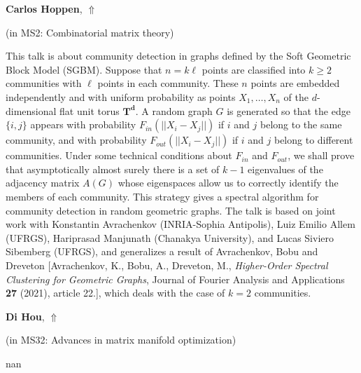 \documentclass[ILAS2025-program.tex]{subfiles}
\begin{document}
\hypertarget{down0296}{}\begin{ilasabstract}
    
\textbf{Carlos Hoppen},  \hfill \hyperlink{up0296}{$\Uparrow$}
    
    
(in {\color{mstitle}MS2: Combinatorial matrix theory})
        
\mtskip
    This talk is about community detection in graphs defined by the Soft Geometric Block Model (SGBM). Suppose that $n=k \ell$ points are classified into $k \geq 2$ communities with $\ell$ points in each community. These $n$ points are embedded independently and with uniform probability as points $X_1,\ldots,X_n$ of the $d$-dimensional flat unit torus $\mathbf{T^d}$. A random graph $G$ is generated so that the edge $\{i,j\}$ appears with probability $F_{in}(||X_i-X_j||)$ if $i$ and $j$ belong to the same community, and with probability $F_{out}(||X_i-X_j||)$  if $i$ and $j$ belong to different communities. Under some technical conditions about $F_{in}$ and $F_{out}$, we shall prove that asymptotically almost surely there is a set of $k-1$ eigenvalues of the adjacency matrix $A(G)$ whose eigenspaces allow us to correctly identify the members of each community. This strategy gives a spectral algorithm for community detection in random geometric graphs. The talk is based on joint work with Konstantin Avrachenkov (INRIA-Sophia Antipolis), Luiz Emilio Allem (UFRGS), Hariprasad Manjunath (Chanakya University), and Lucas Siviero Sibemberg (UFRGS), and generalizes a result of Avrachenkov, Bobu and Dreveton [Avrachenkov, K., Bobu, A., Dreveton, M., \emph{Higher-Order Spectral Clustering for Geometric Graphs}, Journal of Fourier Analysis and Applications {\bf 27} (2021), article 22.], which deals with the case of $k=2$ communities. 

\end{ilasabstract}
    

\hypertarget{down0187}{}\begin{ilasabstract}
    
\textbf{Di Hou},  \hfill \hyperlink{up0187}{$\Uparrow$}
    
    
(in {\color{mstitle}MS32: Advances in matrix manifold optimization})
        
\mtskip
    nan
\end{ilasabstract}
    
\end{document}
